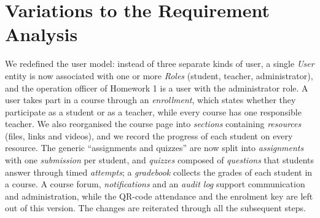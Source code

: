 \section{Variations to the Requirement Analysis}
We redefined the user model: instead of three separate kinds of user, a single \textit{User} entity is now associated with one or more \textit{Roles} (student, teacher, administrator), and the operation officer of Homework 1 is a user with the administrator role. A user takes part in a course through an \textit{enrollment}, which states whether they participate as a student or as a teacher, while every course has one responsible teacher. We also reorganised the course page into \textit{sections} containing \textit{resources} (files, links and videos), and we record the progress of each student on every resource. The generic ``assignments and quizzes'' are now split into \textit{assignments} with one \textit{submission} per student, and \textit{quizzes} composed of \textit{questions} that students answer through timed \textit{attempts}; a \textit{gradebook} collects the grades of each student in a course. A course forum, \textit{notifications} and an \textit{audit log} support communication and administration, while the QR-code attendance and the enrolment key are left out of this version. The changes are reiterated through all the subsequent steps.
